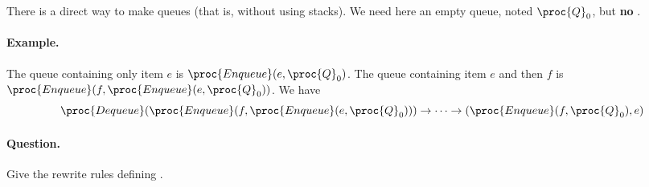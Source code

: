 \noindent There is a direct way to make queues (that is, without using
stacks). We need here an empty queue, noted \(\proc{Q}_0\), but
\textbf{no} .

\paragraph{Example.} The queue containing only item \(e\) is
\(\proc{Enqueue}(e, \proc{Q}_0)\). The queue containing item \(e\) and
then \(f\) is \(\proc{Enqueue}(f, \proc{Enqueue}(e, \proc{Q}_0))\). We
have
\[
\proc{Dequeue}(\proc{Enqueue}(f, \proc{Enqueue}(e, \proc{Q}_0)))
\rightarrow \dots \rightarrow (\proc{Enqueue}(f,\proc{Q}_0), e)
\]

\paragraph{Question.} Give the rewrite rules defining .
